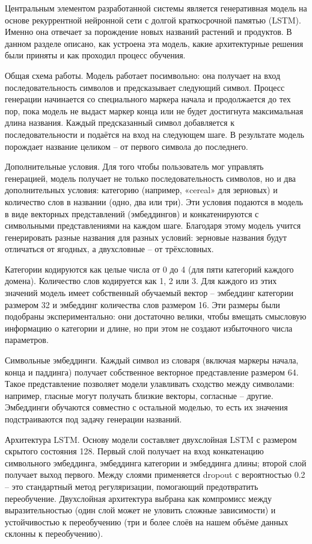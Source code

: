 Центральным элементом разработанной системы является генеративная модель на основе рекуррентной нейронной сети с долгой краткосрочной памятью (LSTM). Именно она отвечает за порождение новых названий растений и продуктов. В данном разделе описано, как устроена эта модель, какие архитектурные решения были приняты и как проходил процесс обучения.

Общая схема работы. Модель работает посимвольно: она получает на вход последовательность символов и предсказывает следующий символ. Процесс генерации начинается со специального маркера начала и продолжается до тех пор, пока модель не выдаст маркер конца или не будет достигнута максимальная длина названия. Каждый предсказанный символ добавляется к последовательности и подаётся на вход на следующем шаге. В результате модель порождает название целиком -- от первого символа до последнего.

Дополнительные условия. Для того чтобы пользователь мог управлять генерацией, модель получает не только последовательность символов, но и два дополнительных условия: категорию (например, «cereal» для зерновых) и количество слов в названии (одно, два или три). Эти условия подаются в модель в виде векторных представлений (эмбеддингов) и конкатенируются с символьными представлениями на каждом шаге. Благодаря этому модель учится генерировать разные названия для разных условий: зерновые названия будут отличаться от ягодных, а двухсловные -- от трёхсловных.

Категории кодируются как целые числа от 0 до 4 (для пяти категорий каждого домена). Количество слов кодируется как 1, 2 или 3. Для каждого из этих значений модель имеет собственный обучаемый вектор -- эмбеддинг категории размером 32 и эмбеддинг количества слов размером 16. Эти размеры были подобраны экспериментально: они достаточно велики, чтобы вмещать смысловую информацию о категории и длине, но при этом не создают избыточного числа параметров.

Символьные эмбеддинги. Каждый символ из словаря (включая маркеры начала, конца и паддинга) получает собственное векторное представление размером 64. Такое представление позволяет модели улавливать сходство между символами: например, гласные могут получать близкие векторы, согласные -- другие. Эмбеддинги обучаются совместно с остальной моделью, то есть их значения подстраиваются под задачу генерации названий.

Архитектура LSTM. Основу модели составляет двухслойная LSTM с размером скрытого состояния 128. Первый слой получает на вход конкатенацию символьного эмбеддинга, эмбеддинга категории и эмбеддинга длины; второй слой получает выход первого. Между слоями применяется dropout с вероятностью 0.2 -- это стандартный метод регуляризации, помогающий предотвратить переобучение. Двухслойная архитектура выбрана как компромисс между выразительностью (один слой может не уловить сложные зависимости) и устойчивостью к переобучению (три и более слоёв на нашем объёме данных склонны к переобучению).

